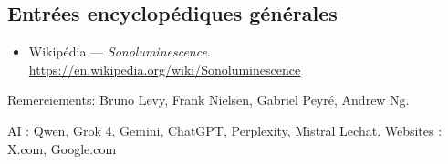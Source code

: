 \documentclass[a4paper,12pt]{article}
\begin{document}
\subsection*{Entrées encyclopédiques générales}
\begin{itemize}
\item Wikipédia — \textit{Sonoluminescence}. \url{https://en.wikipedia.org/wiki/Sonoluminescence}
\end{itemize}
Remerciements: 
Bruno Levy, Frank Nielsen, Gabriel Peyré, Andrew Ng.

AI : Qwen, Grok 4, Gemini, ChatGPT, Perplexity, Mistral Lechat.
Websites : X.com, Google.com
\end{document}
